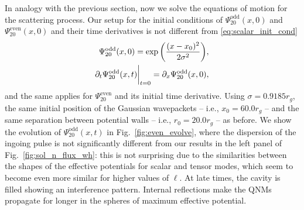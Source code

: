 \documentclass[article,aps,nofootinbib,twocolumn,superscriptaddress]{revtex4-1}
\begin{document}
In analogy with the previous section, now we solve the equations of motion for the scattering process. Our setup for the initial conditions of $\Psi_{20}^{\mathrm{odd}}(x,0)$ and $\Psi_{20}^{\mathrm{even}}(x,0)$ and their time derivatives is not different from \eqref{eq:scalar_init_cond}  
\begin{align}
\displaystyle{\Psi^{\mathrm{odd}}_{20}(x,0)=\exp\left(\frac{(x-x_0)^2}{2\sigma^2}\right)},\nonumber\\
\displaystyle{\partial_t \Psi^{\mathrm{odd}}_{20}(x,t)\bigg{|}_{t=0}=\partial_x\Psi^{\mathrm{odd}}_{20}(x,0)},
\label{eq:tensor_init_cond}
\end{align}
and the same applies for $\Psi^\mathrm{even}_{20}$ and its initial time derivative. Using $\sigma=0.9185r_g$, the same initial position of the Gaussian wavepackets -- i.e., $x_0=60.0r_g$ -- and the same separation between potential walls -- i.e., $r_0=20.0r_g$ -- as before. We show the evolution of $\Psi_{20}^{\mathrm{odd}}(x,t)$ in Fig.~\ref{fig:even_evolve}, where the dispersion of the ingoing pulse is not significantly different from our results in the left panel of Fig.~\ref{fig:sol_n_flux_wh}: this is not surprising due to the similarities between the shapes of the effective potentials for scalar and tensor modes, which seem to become even more similar for higher values of $\ell$. At late times, the cavity is filled showing an interference pattern. Internal reflections make the QNMs propagate for longer in the spheres of maximum effective potential.
\end{document}
